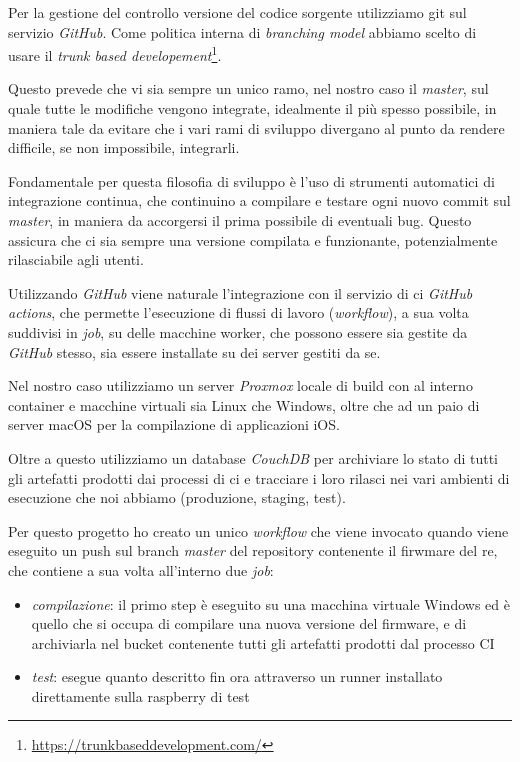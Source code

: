 \documentclass[12pt,a4paper,twoside,titlepage]{book}
\begin{document}
Per la gestione del controllo versione del codice sorgente utilizziamo \Gls{git}
sul servizio \textit{GitHub}. Come politica interna di 
\textit{branching model} abbiamo scelto di usare il \textit{trunk based developement}\footnote{\url{https://trunkbaseddevelopment.com/}}. 

Questo prevede che vi sia sempre un unico ramo, nel nostro caso il \textit{master}, sul 
quale tutte le modifiche vengono integrate, idealmente il più spesso possibile, in 
maniera tale da evitare che i vari rami di sviluppo divergano al punto da rendere difficile,
se non impossibile, integrarli.

Fondamentale per questa filosofia di sviluppo è l'uso di strumenti automatici di integrazione continua,
che continuino a compilare e testare ogni nuovo commit sul \textit{master}, in maniera 
da accorgersi il prima possibile di eventuali bug. Questo assicura che 
ci sia sempre una versione compilata e funzionante, potenzialmente rilasciabile agli utenti. 

Utilizzando \textit{GitHub} viene naturale l'integrazione con il servizio di \acrshort{ci} 
\textit{GitHub actions}, che permette l'esecuzione di flussi di lavoro (\textit{workflow}), 
a sua volta suddivisi in \textit{job}, su delle macchine worker, che possono essere sia 
gestite da \textit{GitHub} stesso, sia essere installate su dei server gestiti da se. 

Nel nostro caso utilizziamo un server \textit{Proxmox} locale di build con al interno container e macchine virtuali 
sia Linux che Windows, oltre che ad un paio di server macOS per la compilazione di applicazioni iOS. 

Oltre a questo utilizziamo un database \textit{CouchDB} per archiviare lo stato di tutti 
gli artefatti prodotti dai processi di \acrshort{ci} e tracciare i loro rilasci nei vari ambienti di 
esecuzione che noi abbiamo (produzione, staging, test). 

Per questo progetto ho creato un unico \textit{workflow} che viene invocato quando viene eseguito 
un push sul branch \textit{master} del repository contenente il firwmare del \acrshort{re}, 
che contiene a sua volta all'interno due \textit{job}:
\begin{itemize}
    \item \textit{compilazione}: il primo step è eseguito su una macchina virtuale Windows 
        ed è quello che si occupa di compilare una nuova versione del \gls{firmware}, e di archiviarla
        nel bucket contenente tutti gli artefatti prodotti dal processo CI
    \item \textit{test}: esegue quanto descritto fin ora attraverso un runner installato 
        direttamente sulla raspberry di test 
\end{itemize}
\end{document}
